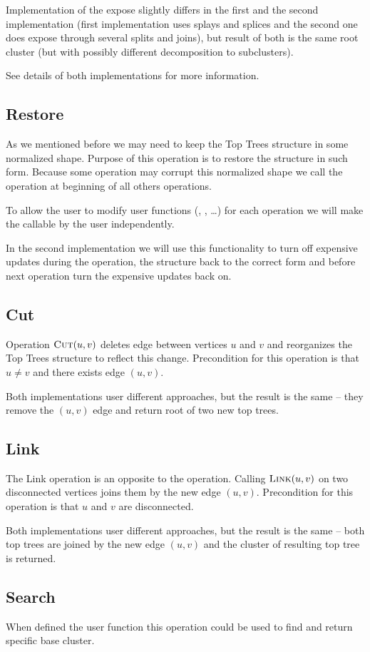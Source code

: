 Implementation of the expose slightly differs in the first and the second
implementation (first implementation uses splays and splices and the second one
does expose through several splits and joins), but result of both is the
same root cluster (but with possibly different decomposition to subclusters).

See details of both implementations for more information.

\subsection{\sc Restore}

As we mentioned before we may need to keep the Top Trees structure in some
normalized shape. Purpose of this operation is to restore the structure
in such form. Because some operation may corrupt this normalized shape we
call the \Restore{} operation at beginning of all others operations.

To allow the user to modify user functions (\Split, \Join, \dots) for each
operation we will make the \Restore{} callable by the user independently.

In the second implementation we will use this functionality to turn off
expensive updates during the \Expose{} operation, \Restore{} the structure back to the
correct form and before next operation turn the expensive updates back on.

\subsection{\sc Cut}

Operation $\hbox{\sc Cut}(u,v)$ deletes edge between vertices $u$ and $v$ and reorganizes
the Top Trees structure to reflect this change. Precondition for this operation
is that $u\ne v$ and there exists edge $(u,v)$.

Both implementations user different approaches, but the result is the same --
they remove the $(u,v)$ edge and return root of two new top trees.

\subsection{\sc Link}

The Link operation is an opposite to the \Cut{} operation. Calling $\hbox{\sc Link}(u,v)$ on
two disconnected vertices joins them by the new edge $(u,v)$. Precondition for
this operation is that $u$ and $v$ are disconnected.

Both implementations user different approaches, but the result is the same --
both top trees are joined by the new edge $(u,v)$ and the cluster of resulting
top tree is returned.

\subsection{\sc Search}

When defined the \Choose{} user function this operation could be used to find
and return specific base cluster.

